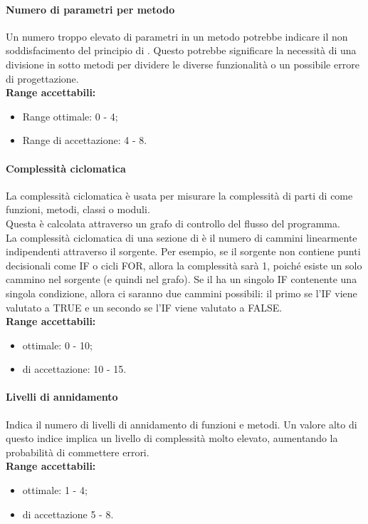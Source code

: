 \documentclass{scalatekids-article}
\begin{document}
\paragraph{Numero di parametri per metodo}
Un numero troppo elevato di parametri in un metodo potrebbe indicare il non soddisfacimento del principio di \textit{}. Questo potrebbe significare la necessità di una divisione in sotto metodi per dividere le diverse funzionalità o un possibile errore di progettazione.\\
\textbf{Range accettabili:}
\begin{itemize}
\item Range ottimale: 0 - 4;
\item Range di accettazione: 4 - 8.
\end{itemize}

\paragraph{Complessità ciclomatica}
La complessità ciclomatica è usata per misurare la complessità di parti di  come funzioni, metodi, classi o moduli.\\
Questa è calcolata attraverso un grafo di controllo del flusso del programma.\\La complessità ciclomatica di una sezione di  è il numero di cammini linearmente indipendenti attraverso il  sorgente. Per esempio, se il  sorgente non contiene punti decisionali come IF o cicli FOR, allora la complessità sarà 1, poiché esiste un solo cammino nel sorgente (e quindi nel grafo). Se il  ha un singolo IF contenente una singola condizione, allora ci saranno due cammini possibili: il primo se l'IF viene valutato a TRUE e un secondo se l'IF viene valutato a FALSE.\\
\textbf{Range accettabili:}
\begin{itemize}
\item {} ottimale: 0 - 10;
\item {} di accettazione: 10 - 15.
\end{itemize}

\paragraph{Livelli di annidamento}
Indica il numero di livelli di annidamento di funzioni e metodi. Un valore alto di questo indice implica un livello di complessità molto elevato, aumentando la probabilità di commettere errori.\\
\textbf{Range accettabili:}
\begin{itemize}
\item {} ottimale: 1 - 4;
\item {} di accettazione 5 - 8.
\end{itemize}
\newpage
\appendix
\end{document}
